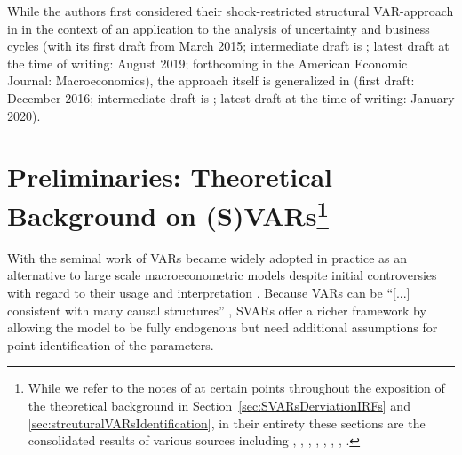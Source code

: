 \documentclass[a4paper,11pt,listof=nochaptergap,oneside,pointednumbers,bibtotoc,bigheadings,liststotoc,hidelinks]{scrbook}
\theoremstyle{mysatz}
\theoremstyle{mydefinition}
\theoremstyle{mytheorem}
\theoremstyle{mybemerkung}
\begin{document}
While the authors first considered their shock-restricted structural VAR-approach in \citet{ludvigsonetal:19} in the context of an application to the analysis of uncertainty and business cycles (with its first draft from March 2015; intermediate draft is \citet{ludvigsonetal:18}; latest draft at the time of writing: August 2019; forthcoming in the American Economic Journal: Macroeconomics), the approach itself is generalized in \citet{ludvigsonetal:20a} (first draft: December 2016; intermediate draft is \citet{ludvigsonetal:17}; latest draft at the time of writing: January 2020).

\section[Preliminaries: Theoretical Background on (S)VARs]{Preliminaries: Theoretical Background on (S)VARs\footnote{While we refer to the notes of \citet{zivot:00} at certain points throughout the exposition of the theoretical background in Section~\ref{sec:SVARsDerviationIRFs} and \ref{sec:strcuturalVARsIdentification}, in their entirety these sections are the consolidated results of various sources including \citet{hamilton:94}, \citet{lutkepohl:05}, \citet{stockwatson:01}, \citet{villaramirez:10}, \citet{kunst:07}, \citet{whelan:16}, \citet{zivot:00}, \citet{foroni:14}.}}
With the seminal work of \citet{sims:80} VARs became widely adopted in practice as an alternative to large scale macroeconometric models despite initial controversies with regard to their usage and interpretation \citep{canova:95, canova:95b}. Because VARs can be ``[...] consistent with many causal structures'' \citep[p. 1]{ludvigsonetal:20a}, SVARs offer a richer framework by allowing the model to be fully endogenous but need additional assumptions for point identification of the parameters.

\label{sec:TheoreticalBackgroundSVARs}
\end{document}
